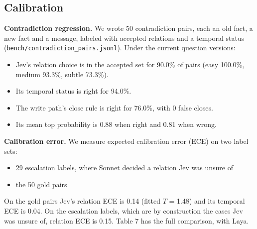 \documentclass[11pt]{article}
\newcommand{\src}[1]{}
\begin{document}
\subsection{Calibration}
\textbf{Contradiction regression.} We wrote 50\src{bench/results/tradeoff.json} contradiction pairs, each an old fact, a new fact and a message, labeled with accepted relations and a temporal status (\texttt{bench/contradiction\_\allowbreak{}pairs.jsonl}). Under the current question versions:

\begin{itemize}
\item Jev's relation choice is in the accepted set for 90.0\%\src{bench/results/jev_regression_v2.json} of pairs (easy 100.0\%\src{bench/results/jev_regression_v2.json}, medium 93.3\%\src{bench/results/jev_regression_v2.json}, subtle 73.3\%\src{bench/results/jev_regression_v2.json}).
\item Its temporal status is right for 94.0\%\src{bench/results/jev_regression_v2.json}.
\item The write path's close rule is right for 76.0\%\src{bench/results/jev_regression_v2.json}, with 0\src{bench/results/jev_regression_v2.json} false closes.
\item Its mean top probability is 0.88\src{bench/results/jev_regression_v2.json} when right and 0.81\src{bench/results/jev_regression_v2.json} when wrong.
\end{itemize}
\textbf{Calibration error.} We measure expected calibration error (ECE) on two label sets:

\begin{itemize}
\item 29\src{bench/results/calibration.json} escalation labels, where Sonnet decided a relation Jev was unsure of
\item the 50\src{bench/results/tradeoff.json} gold pairs
\end{itemize}
On the gold pairs Jev's relation ECE is 0.14\src{bench/results/calibration.json} (fitted $T$ = 1.48\src{bench/results/calibration.json}) and its temporal ECE is 0.04\src{bench/results/calibration.json}. On the escalation labels, which are by construction the cases Jev was unsure of, relation ECE is 0.15\src{bench/results/calibration.json}. Table 7 has the full comparison, with Laya.
\end{document}
